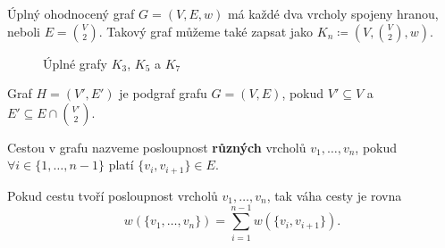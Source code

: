 \begin{definition}
    \label{definice:uplny_ohodnoceny_graf}
    Úplný ohodnocený graf $G = (V, E, w)$ má kaž\-dé dva vrcholy spojeny hranou, neboli $E = \binom{V}{2}$. Takový graf můžeme také zapsat jako $K_n \coloneqq (V,\binom{V}{2},w)$.
    \begin{figure}[h]
        \centering
        \begin{subfigure}[b]{0.3\textwidth}
            \centering
        \end{subfigure}
        \begin{subfigure}[b]{0.3\textwidth}
            \centering
        \end{subfigure}
        \begin{subfigure}[b]{0.3\textwidth}
            \centering
        \end{subfigure}
        \caption{Úplné grafy $K_3$, $K_5$ a $K_7$}
        \label{obr:uplne_ohodnocene_grafy}

    \end{figure}
\end{definition}

\begin{definition}[Podgraf]
    Graf $H = (V', E')$ je podgraf grafu $G = (V, E)$, pokud $V' \subseteq V$ a $E' \subseteq E \cap \binom{V'}{2}$.
    
\end{definition}

\begin{definition}[Cesta]
    \label{definice:cesta}
    Cestou v grafu nazveme posloupnost \textbf{různých} vrcholů $v_1, \ldots, v_n$, pokud $\forall i \in \{1,\ldots, n-1\}$ platí $\{v_i, v_{i+1}\} \in E$.  
\end{definition}

\begin{definition}
    \label{definice:vaha_cesty}
    Pokud cestu tvoří posloupnost vrcholů $v_1, \ldots, v_n$, tak váha cesty je rovna \[ w(\{v_1,\dots ,v_n\}) = \sum_{i=1}^{n-1}w(\{v_i, v_{i+1}\}). \]
    
\end{definition}

